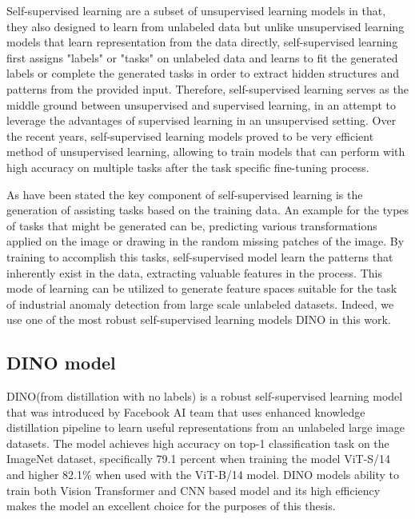Self-supervised learning are a subset of unsupervised learning models in that, they also designed to learn from unlabeled data but unlike unsupervised learning models that learn representation from the data directly, self-supervised learning first assigns "labels" or "tasks" on unlabeled data and learns to fit the generated labels or complete the generated tasks in order to extract hidden structures and patterns from the provided input. Therefore, self-supervised learning serves as the middle ground between unsupervised and supervised learning, in an attempt to leverage the advantages of supervised learning in an unsupervised setting. Over the recent years, self-supervised learning models proved to be very efficient method of unsupervised learning, allowing to train models that can perform with high accuracy on multiple tasks after the task specific fine-tuning process.

As have been stated the key component of self-supervised learning is the generation of assisting tasks based on the training data. An example for the types of tasks that might be generated can be, predicting various transformations applied on the image or drawing in the random missing patches of the image. By training to accomplish this tasks, self-supervised model learn the patterns that inherently exist in the data, extracting valuable features in the process. This mode of learning can be utilized to generate feature spaces suitable for the task of industrial anomaly detection from large scale unlabeled datasets. Indeed, we use one of the most robust self-supervised learning models DINO in this work.

\subsection{DINO model}
\label{dino}

DINO(from distillation with no labels) is a robust self-supervised learning model that was introduced by Facebook AI team that uses enhanced knowledge distillation pipeline to learn useful representations from an unlabeled large image datasets. The model achieves high accuracy on top-1 classification task on the ImageNet dataset, specifically 79.1 percent when training the model ViT-S/14 and higher 82.1\% when used with the ViT-B/14 model. DINO models ability to train both Vision Transformer and CNN based model and its high efficiency makes the model an excellent choice for the purposes of this thesis.

